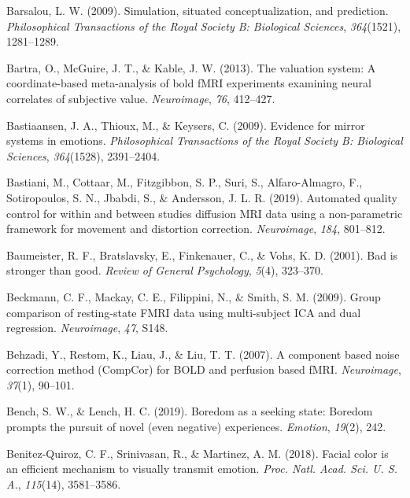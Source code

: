 \documentclass[12pt,american,a4paper,oneside,]{memoir} %
\begin{document}
\leavevmode\hypertarget{ref-barsalou2009simulation}{}%
Barsalou, L. W. (2009). Simulation, situated conceptualization, and prediction. \emph{Philosophical Transactions of the Royal Society B: Biological Sciences}, \emph{364}(1521), 1281--1289.

\leavevmode\hypertarget{ref-bartra2013valuation}{}%
Bartra, O., McGuire, J. T., \& Kable, J. W. (2013). The valuation system: A coordinate-based meta-analysis of bold fMRI experiments examining neural correlates of subjective value. \emph{Neuroimage}, \emph{76}, 412--427.

\leavevmode\hypertarget{ref-bastiaansen2009evidence}{}%
Bastiaansen, J. A., Thioux, M., \& Keysers, C. (2009). Evidence for mirror systems in emotions. \emph{Philosophical Transactions of the Royal Society B: Biological Sciences}, \emph{364}(1528), 2391--2404.

\leavevmode\hypertarget{ref-Bastiani2019-sm}{}%
Bastiani, M., Cottaar, M., Fitzgibbon, S. P., Suri, S., Alfaro-Almagro, F., Sotiropoulos, S. N., Jbabdi, S., \& Andersson, J. L. R. (2019). Automated quality control for within and between studies diffusion MRI data using a non-parametric framework for movement and distortion correction. \emph{Neuroimage}, \emph{184}, 801--812.

\leavevmode\hypertarget{ref-baumeister2001bad}{}%
Baumeister, R. F., Bratslavsky, E., Finkenauer, C., \& Vohs, K. D. (2001). Bad is stronger than good. \emph{Review of General Psychology}, \emph{5}(4), 323--370.

\leavevmode\hypertarget{ref-Beckmann2009-rs}{}%
Beckmann, C. F., Mackay, C. E., Filippini, N., \& Smith, S. M. (2009). Group comparison of resting-state FMRI data using multi-subject ICA and dual regression. \emph{Neuroimage}, \emph{47}, S148.

\leavevmode\hypertarget{ref-Behzadi2007-eb}{}%
Behzadi, Y., Restom, K., Liau, J., \& Liu, T. T. (2007). A component based noise correction method (CompCor) for BOLD and perfusion based fMRI. \emph{Neuroimage}, \emph{37}(1), 90--101.

\leavevmode\hypertarget{ref-bench2019boredom}{}%
Bench, S. W., \& Lench, H. C. (2019). Boredom as a seeking state: Boredom prompts the pursuit of novel (even negative) experiences. \emph{Emotion}, \emph{19}(2), 242.

\leavevmode\hypertarget{ref-Benitez-Quiroz2018-vr}{}%
Benitez-Quiroz, C. F., Srinivasan, R., \& Martinez, A. M. (2018). Facial color is an efficient mechanism to visually transmit emotion. \emph{Proc. Natl. Acad. Sci. U. S. A.}, \emph{115}(14), 3581--3586.
\end{document}
